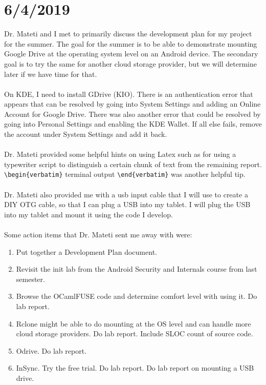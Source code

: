 \section{6/4/2019}
Dr. Mateti and I met to primarily discuss the development plan for my project for the summer. The goal for the summer is to be able to demonstrate mounting Google Drive at the operating system level on an Android device. The secondary goal is to try the same for another cloud storage provider, but we will determine later if we have time for that. \\ \\
On KDE, I need to install GDrive (KIO). There is an authentication error that appears that can be resolved by going into System Settings and adding an Online Account for Google Drive. There was also another error that could be resolved by going into Personal Settings and enabling the KDE Wallet. If all else fails, remove the account under System Settings and add it back. \\ \\
Dr. Mateti provided some helpful hints on using Latex such as \texttt{\tt} for using a typewriter script to distinguish a certain chunk of text from the remaining report. \verb|\begin{verbatim}| terminal output \verb|\end{verbatim}| was another helpful tip. \\ \\
Dr. Mateti also provided me with a usb input cable that I will use to create a DIY OTG cable, so that I can plug a USB into my tablet. I will plug the USB into my tablet and mount it using the code I develop. \\ \\
Some action items that Dr. Mateti sent me away with were:
\begin{enumerate}
\item Put together a Development Plan document.
\item Revisit the init lab from the Android Security and Internals course from last semester.
\item Browse the OCamlFUSE code and determine comfort level with using it. Do lab report.
\item Rclone might be able to do mounting at the OS level and can handle more cloud storage providers. Do lab report. Include SLOC count of source code.
\item Odrive. Do lab report.
\item InSync. Try the free trial. Do lab report.
Do lab report on mounting a USB drive.
\end{enumerate}
